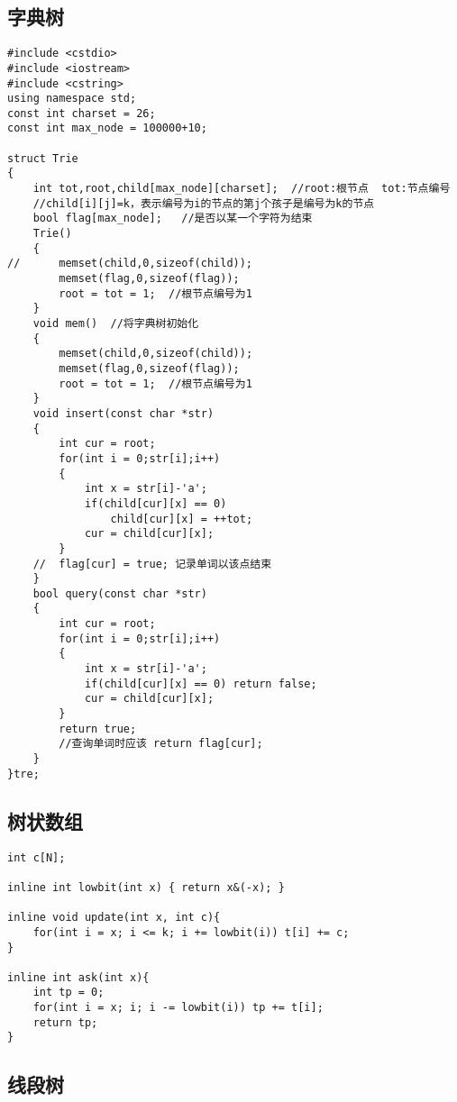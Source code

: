 \documentclass[twoside]{article}
\begin{document}
\subsection{字典树}
\begin{lstlisting}
#include <cstdio>
#include <iostream>
#include <cstring>
using namespace std; 
const int charset = 26;
const int max_node = 100000+10;

struct Trie
{
	int tot,root,child[max_node][charset];  //root:根节点  tot:节点编号
	//child[i][j]=k，表示编号为i的节点的第j个孩子是编号为k的节点
	bool flag[max_node];   //是否以某一个字符为结束
	Trie()
	{
//		memset(child,0,sizeof(child));
		memset(flag,0,sizeof(flag)); 
		root = tot = 1;  //根节点编号为1 
	}	
	void mem()  //将字典树初始化 
	{
		memset(child,0,sizeof(child));
		memset(flag,0,sizeof(flag)); 
		root = tot = 1;  //根节点编号为1 
	}
	void insert(const char *str)
	{
		int cur = root;
		for(int i = 0;str[i];i++)
		{
			int x = str[i]-'a';
			if(child[cur][x] == 0)
				child[cur][x] = ++tot;
			cur = child[cur][x];
		}
	//	flag[cur] = true; 记录单词以该点结束 
	}
	bool query(const char *str)
	{
		int cur = root;
		for(int i = 0;str[i];i++)
		{
			int x = str[i]-'a';
			if(child[cur][x] == 0) return false;
			cur = child[cur][x];
		}
		return true;
		//查询单词时应该 return flag[cur]; 
	}
}tre;\end{lstlisting}
\subsection{树状数组}
\begin{lstlisting}
int c[N];

inline int lowbit(int x) { return x&(-x); }

inline void update(int x, int c){
	for(int i = x; i <= k; i += lowbit(i)) t[i] += c;
}

inline int ask(int x){
	int tp = 0;
	for(int i = x; i; i -= lowbit(i)) tp += t[i];
	return tp;
}\end{lstlisting}
\subsection{线段树}
\end{document}
